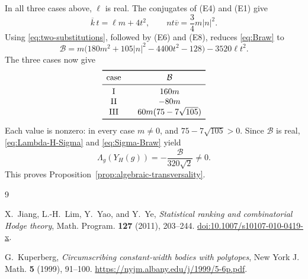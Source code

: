 \documentclass[11pt,reqno]{amsart}
\theoremstyle{remark}
\newcommand{\abs}[1]{\left\lvert #1\right\rvert}
\begin{document}
In all three cases above, $\ell$ is real.  The conjugates of (E4) and (E1)
give
\begin{equation}\label{eq:two-substitutions}
\overline k\,t=\ell m+4t^2,
\qquad
nt\overline v=\frac34m\abs n^2.
\end{equation}
Using \eqref{eq:two-substitutions}, followed by (E6) and (E8), reduces
\eqref{eq:Braw} to
\begin{equation}\label{eq:B-simplified}
\mathcal B
=m\bigl(180m^2+105\abs n^2-4400t^2-128\bigr)
-3520\ell t^2.
\end{equation}
The three cases now give
\begin{equation}\label{eq:B-values}
\begin{array}{c@{\qquad}c}
\toprule
\text{case}&\mathcal B\\
\midrule
\mathrm{I}&160m\\
\mathrm{II}&-80m\\
\mathrm{III}&60m(75-7\sqrt{105})\\
\bottomrule
\end{array}
\end{equation}
Each value is nonzero: in every case $m\ne0$, and
$75-7\sqrt{105}>0$.  Since $\mathcal B$ is real,
\eqref{eq:Lambda-H-Sigma} and \eqref{eq:Sigma-Braw} yield
\[
\Lambda_g(Y_H(g))=-\frac{\mathcal B}{320\sqrt2}\ne0.
\]
This proves Proposition~\ref{prop:algebraic-transversality}.


\begin{thebibliography}{9}

X.~Jiang, L.-H.~Lim, Y.~Yao, and Y.~Ye,
\emph{Statistical ranking and combinatorial Hodge theory},
Math. Program. \textbf{127} (2011), 203--244.
\href{https://doi.org/10.1007/s10107-010-0419-x}{doi:10.1007/s10107-010-0419-x}.

G.~Kuperberg,
\emph{Circumscribing constant-width bodies with polytopes},
New York J. Math. \textbf{5} (1999), 91--100.
\url{https://nyjm.albany.edu/j/1999/5-6p.pdf}.

\end{thebibliography}
\end{document}
